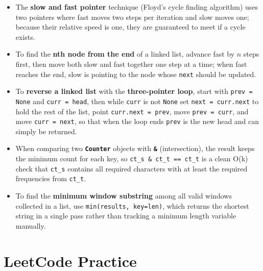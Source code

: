 \documentclass{article}
\begin{document}
\begin{itemize}
    \item The \textbf{slow and fast pointer} technique (Floyd's cycle finding algorithm) uses two pointers where fast moves two steps per iteration and slow moves one; because their relative speed is one, they are guaranteed to meet if a cycle exists.

    \item To find the \textbf{nth node from the end} of a linked list, advance fast by $n$ steps first, then move both slow and fast together one step at a time; when fast reaches the end, slow is pointing to the node whose \texttt{next} should be updated.

    \item To \textbf{reverse a linked list} with the \textbf{three-pointer loop}, start with \texttt{prev = None} and \texttt{curr = head}, then while \texttt{curr} is not \texttt{None} set \texttt{next = curr.next} to hold the rest of the list, point \texttt{curr.next = prev}, move \texttt{prev = curr}, and move \texttt{curr = next}, so that when the loop ends \texttt{prev} is the new head and can simply be returned.

    \item When comparing two \textbf{\texttt{Counter}} objects with \textbf{\texttt{\&}} (intersection), the result keeps the minimum count for each key, so \texttt{ct\_s \& ct\_t == ct\_t} is a clean O(k) check that \texttt{ct\_s} contains all required characters with at least the required frequencies from \texttt{ct\_t}.

    \item To find the \textbf{minimum window substring} among all valid windows collected in a list, use \texttt{min(results, key=len)}, which returns the shortest string in a single pass rather than tracking a minimum length variable manually.

\end{itemize}

\section{LeetCode Practice}
\end{document}
